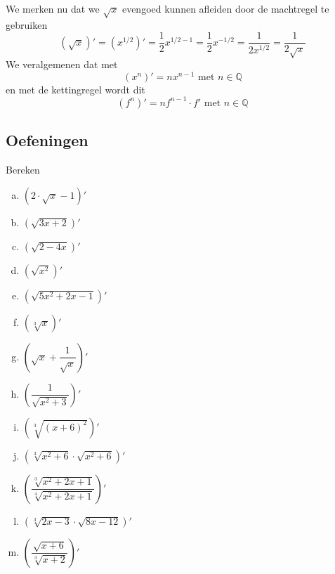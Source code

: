 \documentclass[12pt,twoside,a4paper]{article}
\begin{document}
We merken nu dat we $\sqrt{x}$ evengoed kunnen afleiden door de machtregel te gebruiken
$$
  \left(\sqrt{x}\right)' = \left(x^{1/2}\right)'
                         = \frac{1}{2}x^{1/2-1}
                         = \frac{1}{2}x^{-1/2}
                         = \frac{1}{2x^{1/2}}
                         = \frac{1}{2\sqrt{x}}
$$
We veralgemenen dat met
$$\left(x^n\right)'=nx^{n-1} \mbox{ met } n\in\mathbb{Q}$$
en met de kettingregel wordt dit
$$\left(f^n\right)'=nf^{n-1}\cdot f' \mbox{ met } n\in\mathbb{Q}$$

\subsection{Oefeningen}

\begin{oefening}
Bereken
\begin{multicols}{2}
\begin{enumerate}[(a)]
  \itemsep0.5em
  \item $\displaystyle\left(2\cdot\sqrt{x}-1\right)'$
  \item $\displaystyle\left(\sqrt{3x+2}\right)'$
  \item $\displaystyle\left(\sqrt{2-4x}\right)'$
  \item $\displaystyle\left(\sqrt{x^2}\right)'$
  \item $\displaystyle\left(\sqrt{5x^2+2x-1}\right)'$
  \item $\displaystyle\left(\sqrt[3]{x}\right)'$
  \item $\displaystyle\left(\sqrt{x}+\dfrac{1}{\sqrt{x}}\right)'$
  \item $\displaystyle\left(\dfrac{1}{\sqrt{x^2+3}}\right)'$
  \item $\displaystyle\left(\sqrt[3]{\left(x+6\right)^2}\right)'$
  \item $\displaystyle\left(\sqrt[3]{x^2+6}\cdot\sqrt{x^2+6}\right)'$
  \item $\displaystyle\left(\dfrac{\sqrt[3]{x^2+2x+1}}{\sqrt[4]{x^2+2x+1}}\right)'$
  \item $\displaystyle\left(\sqrt[3]{2x-3}\cdot\sqrt{8x-12}\right)'$
  \item $\displaystyle\left(\dfrac{\sqrt{x+6}}{\sqrt[3]{x+2}}\right)'$
\end{enumerate}
\end{multicols}
\end{oefening}
\end{document}

